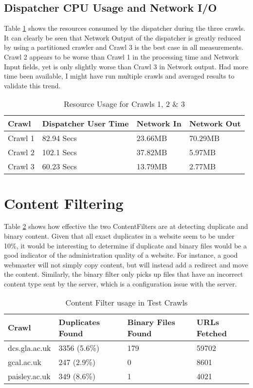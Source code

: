 \subsection{Dispatcher CPU Usage and Network I/O}
Table \ref{tbl-evalresources} shows the resources consumed by the dispatcher during the three crawls. It can clearly be seen that Network Output of the dispatcher is greatly reduced by using a partitioned crawler and Crawl 3 is the best case in all measurements. Crawl 2 appears to be worse than Crawl 1 in the processing time and Network Input fields, yet is only slightly worse than Crawl 3 in Network output. Had more time been available, I might have run multiple crawls and averaged results to validate this trend.
\begin{table}
\begin{center}
\begin{tabular}{|l|l|l|l|}
\hline
\bf{Crawl} & \bf{Dispatcher User Time} & \bf{Network In} & \bf{Network Out} \\
\hline
Crawl 1 & 82.94 Secs & 23.66MB & 70.29MB \\
\hline
Crawl 2 & 102.1 Secs & 37.82MB & 5.97MB \\
\hline
Crawl 3 & 60.23 Secs & 13.79MB & 2.77MB \\
\hline
\end{tabular}
\caption{Resource Usage for Crawls 1, 2 \& 3}\label{tbl-evalresources}
\end{center}
\end{table}

\section{Content Filtering}
Table \ref{tbl-evalcontentfilters} shows how effective the two ContentFilters are at detecting duplicate and binary content. Given that all exact duplicates in a website seem to be under 10\%, it would be interesting to determine if duplicate and binary files would be a good indicator of the administration quality of a website. For instance, a good webmaster will not simply copy content, but will instead add a redirect and move the content. Similarly, the binary filter only picks up files that have an incorrect content type sent by the server, which is a configuration issue with the server.
\begin{table}
\begin{center}
\begin{tabular}{|l|l|l|l|}
\hline
\bf{Crawl} & \bf{Duplicates Found} & \bf{Binary Files Found} & \bf{URLs Fetched} \\
\hline
dcs.gla.ac.uk & 3356 (5.6\%) & 179 & 59702 \\
\hline
gcal.ac.uk & 247 (2.9\%) & 0 & 8601 \\
\hline
paisley.ac.uk & 349 (8.6\%) & 1 & 4021 \\
\hline
\end{tabular}
\caption{Content Filter usage in Test Crawls}\label{tbl-evalcontentfilters}
\end{center}
\end{table}


